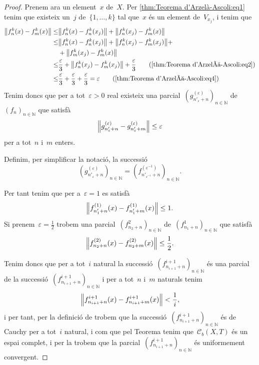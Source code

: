 \documentclass[../../main.tex]{subfiles}
\begin{document}
\begin{lemma}
\begin{proof}
            Prenem ara un element~\(x\) de~\(X\).
            Per \eqref{thm:Teorema d'Arzelà-Ascoli:eq1} tenim que existeix un~\(j\) de~\(\{1,\dots,k\}\) tal que~\(x\) és un element de~\(V_{x_{j}}\), i tenim que
            \begin{align*}
                \norm{f^{k}_{n}(x)-f^{k}_{m}(x)}\leq&\norm{f^{k}_{n}(x)-f^{k}_{n}(x_{j})}+\norm{f^{k}_{n}(x_{j})-f^{k}_{m}(x)} \\
                \leq&\norm{f^{k}_{n}(x)-f^{k}_{n}(x_{j})}+\norm{f^{k}_{n}(x_{j})-f^{k}_{m}(x_{j})}+\\&+\norm{f^{k}_{m}(x_{j})-f^{k}_{m}(x)} \\
                \leq&\frac{\varepsilon}{3}+\norm{f^{k}_{n}(x_{j})-f^{k}_{m}(x_{j})}+\frac{\varepsilon}{3}\tag{\ref{thm:Teorema d'Arzelà-Ascoli:eq2}} \\
                \leq&\frac{\varepsilon}{3}+\frac{\varepsilon}{3}+\frac{\varepsilon}{3}=\varepsilon\tag{\ref{thm:Teorema d'Arzelà-Ascoli:eq4}}
            \end{align*}
            Tenim doncs que per a tot~\(\varepsilon>0\) real existeix una parcial~\((g^{(\varepsilon)}_{n'_{\varepsilon}+n})_{n\in\mathbb{N}}\) de~\((f_{n})_{n\in\mathbb{N}}\) que satisfà
            \[
                \norm{g^{(\varepsilon)}_{n'_{\varepsilon}+n}-g^{(\varepsilon)}_{n'_{\varepsilon}+m}}\leq\varepsilon
            \]
            per a tot~\(n\) i~\(m\) enters.

            Definim, per simplificar la notació, la successió
            \[
                \left(g^{(\varepsilon)}_{n'_{\varepsilon}+n}\right)_{n\in\mathbb{N}}=\left(f^{(\varepsilon^{-1})}_{n'_{\varepsilon^{-1}}+n}\right)_{n\in\mathbb{N}}.
            \]

            Per tant tenim que per a~\(\varepsilon=1\) es satisfà
            \[
                \norm{f^{(1)}_{n'_{1}+n}(x)-f^{(1)}_{n'_{1}+m}(x)}\leq1.
            \]
            Si prenem~\(\varepsilon=\frac{1}{2}\) trobem una parcial~\((f^{2}_{n_{2}+n})_{n\in\mathbb{N}}\) de~\((f^{1}_{n_{1}+n})_{n\in\mathbb{N}}\) que satisfà
            \[
                \norm{f^{(2)}_{n_{2}+n}(x)-f^{(2)}_{n_{2}+m}(x)}\leq\frac{1}{2}.
            \]

            Tenim doncs que per a tot~\(i\) natural la successió~\((f^{i+1}_{n_{i+1}+n})_{n\in\mathbb{N}}\) és una parcial de la successió~\((f^{i+1}_{n_{i+1}+n})_{n\in\mathbb{N}}\) i per a tot~\(n\) i~\(m\) naturals tenim
            \[
                \norm{f^{i+1}_{n_{i+1}+n}(x)-f^{i+1}_{n_{i+1}+m}(x)}<\frac{1}{i},
            \]
            i per tant, per la definició de  trobem que la successió~\((f^{i+1}_{n_{i+1}+n})_{n\in\mathbb{N}}\) és de Cauchy per a tot~\(i\) natural, i com que pel Teorema  tenim que~\(\mathcal{C}_{b}(X,T)\) és un espai complet, i per la  trobem que la parcial~\((f^{i+1}_{n_{i+1}+n})_{n\in\mathbb{N}}\) és uniformement convergent.
        \end{proof}
    \end{lemma}
\end{document}
